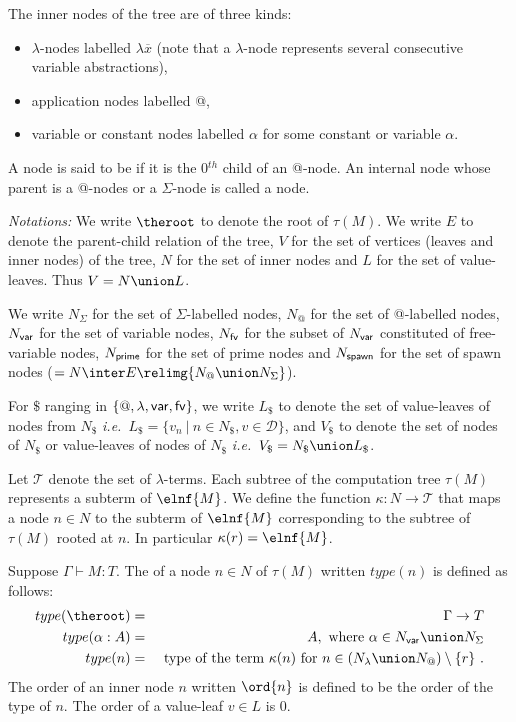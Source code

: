 The inner nodes of the tree are of three kinds:
\begin{itemize}
\item $\lambda$-nodes labelled $\lambda \overline{x}$ (note that a $\lambda$-node represents several consecutive variable abstractions),
\item application nodes labelled @,
\item variable or constant nodes labelled $\alpha$ for some constant or variable $\alpha$.
\end{itemize}
A node is said to be  if it is the 0$^{th}$ child of an @-node.
An internal node whose parent is a @-nodes or a $\Sigma$-node is called a  node.
\bigskip

\emph{Notations:} We write $\theroot$ to denote the root of
$\tau(M)$. We write $E$ to denote the parent-child relation of the
tree, $V$ for the set of vertices (leaves and inner nodes) of the
tree, $N$ for the set of inner nodes and $L$ for the set of
value-leaves. Thus $V = N \union L$.

We write $N_\Sigma$ for the set of $\Sigma$-labelled nodes, $N_@$ for the set
of @-labelled nodes, $N_{\sf var}$ for the set of variable nodes,
$N_{\sf fv}$ for the subset of $N_{\sf var}$ constituted of free-variable nodes, $N_{\sf prime}$ for the set of prime nodes
and $N_{\sf spawn}$ for the set of spawn nodes ($= N \inter E \relimg{N_@ \union N_\Sigma}$).

For $\$$ ranging in $\{@, \lambda, {\sf var}, {\sf fv} \}$,
we write $L_\$$ to denote the set of value-leaves of nodes from $N_\$$
{\it i.e.}\ $L_\$ = \{ v_n \ | \ n \in N_\$, v \in \mathcal{D} \}$,
and $V_\$$ to denote the set of nodes of $N_\$$ or value-leaves of nodes of $N_\$$
{\it i.e.}\ $V_\$ = N_\$ \union L_\$ $.


Let $\mathcal{T}$ denote the set of $\lambda$-terms.
Each subtree of the computation tree $\tau(M)$ represents a subterm of $\elnf{M}$.
We define the function $\kappa : N \rightarrow \mathcal{T}$ that maps a node $n \in N$ to the subterm of $\elnf{M}$
corresponding to the subtree of $\tau(M)$ rooted at $n$.
In particular $\kappa(r) = \elnf{M}$.

\begin{definition}
\label{def:nodeorder}
Suppose $\Gamma \vdash M : T$.
The  of a node $n \in N$ of $\tau(M)$ written $type(n)$ is defined as follows:
\begin{eqnarray*}
type(\theroot) &=& \Gamma \rightarrow T \\
type(\alpha:A) &=& A, \mbox{ where $\alpha \in N_{\sf var} \union N_\Sigma$} \\
type(n) &=& \hbox{ type of the term $\kappa(n)$ for $n \in (N_\lambda \union N_@) \setminus \{r \}$\ .}
\end{eqnarray*}
The order of an inner node $n$ written $\ord{n}$ is defined to be
the order of the type of $n$. The order of a value-leaf $v \in L$ is
$0$.
\end{definition}

